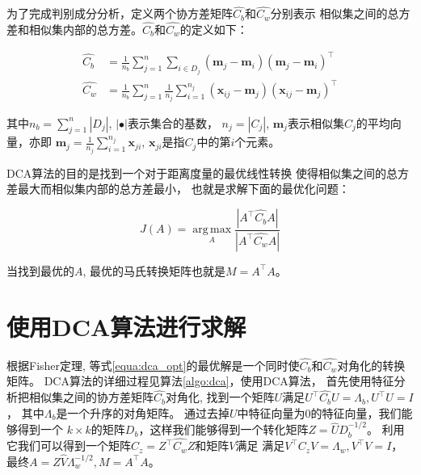 为了完成判别成分分析，定义两个协方差矩阵$\hat{C_b}$和$\hat{C_w}$分别表示
相似集之间的总方差和相似集内部的总方差。$\hat{C_b}$和$\hat{C_w}$的定义如下：

\begin{align}
\label{equa:cb}
    \hat{C_b} &= \frac{1}{n_b} \sum_{j=1}^n \sum_{i \in D_j} (\bm{m}_j - \bm{m}_i)(\bm{m}_j - \bm{m}_i)^\top \\
\label{equa:cw}
    \hat{C_w} &= \frac{1}{n_b} \sum_{j=1}^n \frac{1}{n_j} \sum_{i = 1}^{n_j} (\bm{x}_{ij} - \bm{m}_j)(\bm{x}_{ij} - \bm{m}_j)^\top
\end{align} 

其中$n_b = \sum_{j=1}^{n}|D_j|$, $|\bullet|$表示集合的基数，
$n_j = |C_j|$,
$\bm{m}_j$表示相似集$C_j$的平均向量，亦即
$\bm{m}_j = \frac{1}{n_j} \sum_{i=1}^{n_j} \bm{x}_{ji}$, 
$\bm{x}_{ji}$是指$C_j$中的第$i$个元素。

DCA算法的目的是找到一个对于距离度量的最优线性转换
使得相似集之间的总方差最大而相似集内部的总方差最小，
也就是求解下面的最优化问题：

\begin{equation}
    \label{equa:dca_opt}
    J(A) = \operatorname*{arg\,max}_A \frac {|A^\top \hat{C_b} A|} {|A^\top \hat{C_w} A|}
\end{equation}

当找到最优的$A$, 最优的马氏转换矩阵也就是$M = A^\top A$。

\section{使用DCA算法进行求解}
\label{sec:algorithm_dca}


根据Fisher定理,
等式\ref{equa:dca_opt}的最优解是一个同时使$\hat{C_b}$和$\hat{C_w}$对角化的转换矩阵。
DCA算法的详细过程见算法\ref{algo:dca}，使用DCA算法，
首先使用特征分析把相似集之间的协方差矩阵$\hat{C_b}$对角化,
找到一个矩阵$U$满足$U^\top \hat{C_b} U = \Lambda_b, U^\top U = I$，
其中$\Lambda_b$是一个升序的对角矩阵。
通过去掉$U$中特征向量为0的特征向量，我们能够得到一个
$k \times k$的矩阵$D_b$，这样我们能够得到一个转化矩阵$Z = \hat{U}D_b^{-1/2}$。
利用它我们可以得到一个矩阵$C_z = Z^\top\hat{C_w}Z$和矩阵$V$满足
满足$V^\top C_z V = \Lambda_w, V^\top V = I$，
最终$A = Z\hat{V}\Lambda_w^{-1/2}, M = A^\top A$。 
 

